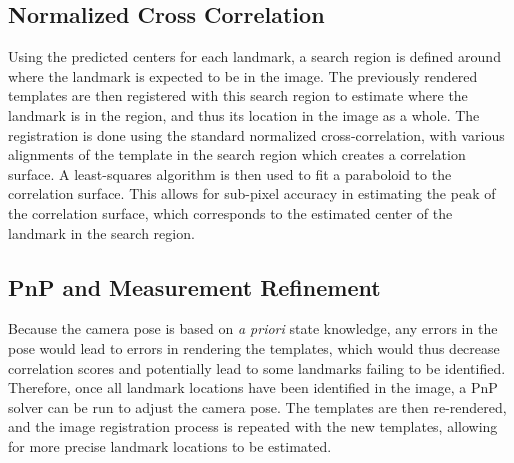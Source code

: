 \documentclass{RPI-SIW}
\begin{document}
\subsection*{Normalized Cross Correlation}
Using the predicted centers for each landmark, a search region is defined around where the landmark is expected to be in the image.  The previously rendered templates are then registered with this search region to estimate where the landmark is in the region, and thus its location in the image as a whole.  The registration is done using the standard normalized cross-correlation, with various alignments of the template in the search region which creates a correlation surface.  A least-squares algorithm is then used to fit a paraboloid to the correlation surface.  This allows for sub-pixel accuracy in estimating the peak of the correlation surface, which corresponds to the estimated center of the landmark in the search region.

\subsection*{PnP and Measurement Refinement}
Because the camera pose is based on \textit{a priori} state knowledge, any errors in the pose would lead to errors in rendering the templates, which would thus decrease correlation scores and potentially lead to some landmarks failing to be identified.  Therefore, once all landmark locations have been identified in the image, a PnP solver can be run to adjust the camera pose.  The templates are then re-rendered, and the image registration process is repeated with the new templates, allowing for more precise landmark locations to be estimated.

\end{document}
